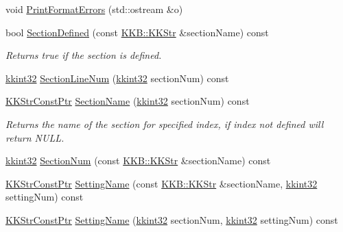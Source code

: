 \begin{DoxyCompactItemize}
void \hyperlink{class_k_k_b_1_1_configuration_aa20014b94bcc40e3c6b283821c42e212}{Print\+Format\+Errors} (std\+::ostream \&o)
\item 
bool \hyperlink{class_k_k_b_1_1_configuration_a5fc44650421878e33f9e9e537f71bdab}{Section\+Defined} (const \hyperlink{class_k_k_b_1_1_k_k_str}{K\+K\+B\+::\+K\+K\+Str} \&section\+Name) const 
\begin{DoxyCompactList}\small\item\em Returns true if the section is defined. \end{DoxyCompactList}\item 
\hyperlink{namespace_k_k_b_a8fa4952cc84fda1de4bec1fbdd8d5b1b}{kkint32} \hyperlink{class_k_k_b_1_1_configuration_a9ec3ea4ab84f5311e22c679087ae485c}{Section\+Line\+Num} (\hyperlink{namespace_k_k_b_a8fa4952cc84fda1de4bec1fbdd8d5b1b}{kkint32} section\+Num) const 
\item 
\hyperlink{namespace_k_k_b_a46f665ec17615c856eff3d21f78bed5c}{K\+K\+Str\+Const\+Ptr} \hyperlink{class_k_k_b_1_1_configuration_aa0c65a7f1f5e7885b6dd50fce22f2c79}{Section\+Name} (\hyperlink{namespace_k_k_b_a8fa4952cc84fda1de4bec1fbdd8d5b1b}{kkint32} section\+Num) const 
\begin{DoxyCompactList}\small\item\em Returns the name of the section for specified index, if index not defined will return N\+U\+LL. \end{DoxyCompactList}\item 
\hyperlink{namespace_k_k_b_a8fa4952cc84fda1de4bec1fbdd8d5b1b}{kkint32} \hyperlink{class_k_k_b_1_1_configuration_a7dad6ea4efdfbf0fda22007cefd5e4cf}{Section\+Num} (const \hyperlink{class_k_k_b_1_1_k_k_str}{K\+K\+B\+::\+K\+K\+Str} \&section\+Name) const 
\item 
\hyperlink{namespace_k_k_b_a46f665ec17615c856eff3d21f78bed5c}{K\+K\+Str\+Const\+Ptr} \hyperlink{class_k_k_b_1_1_configuration_a37b17c503e61082b4da5ca7ad89f542d}{Setting\+Name} (const \hyperlink{class_k_k_b_1_1_k_k_str}{K\+K\+B\+::\+K\+K\+Str} \&section\+Name, \hyperlink{namespace_k_k_b_a8fa4952cc84fda1de4bec1fbdd8d5b1b}{kkint32} setting\+Num) const 
\item 
\hyperlink{namespace_k_k_b_a46f665ec17615c856eff3d21f78bed5c}{K\+K\+Str\+Const\+Ptr} \hyperlink{class_k_k_b_1_1_configuration_a5fe555d390f8aee3cd8da0c4bd2b6a36}{Setting\+Name} (\hyperlink{namespace_k_k_b_a8fa4952cc84fda1de4bec1fbdd8d5b1b}{kkint32} section\+Num, \hyperlink{namespace_k_k_b_a8fa4952cc84fda1de4bec1fbdd8d5b1b}{kkint32} setting\+Num) const 
\item 

\end{DoxyCompactItemize}
